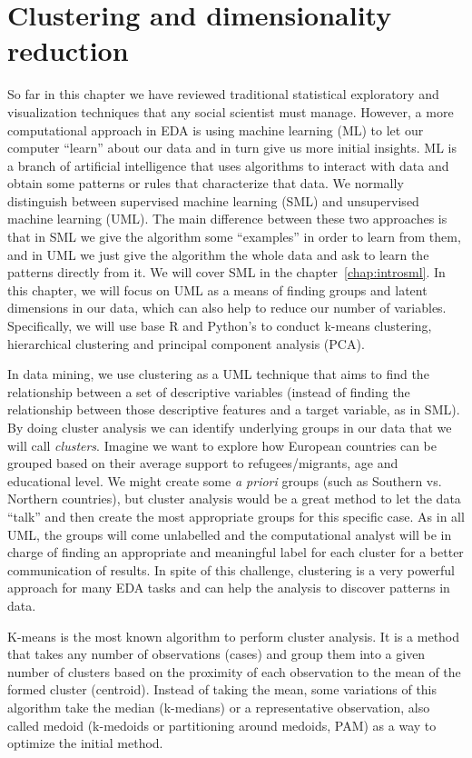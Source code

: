 \section{Clustering and dimensionality reduction}
\label{sec:clustering}

So far in this chapter we have reviewed traditional statistical exploratory and visualization techniques that any social scientist must manage. However, a more computational approach in EDA is using machine learning (ML) to let our computer “learn” about our data and in turn give us more initial insights.  ML is a branch of artificial intelligence that uses algorithms to interact with data and obtain some patterns or rules that characterize that data. We normally distinguish between supervised machine learning (SML) and unsupervised machine learning (UML). The main difference between these two approaches is that in SML we give the algorithm some “examples” in order to learn from them, and in UML we just give the algorithm the whole data and ask to learn the patterns directly from it. We will cover SML in the  chapter~\ref{chap:introsml}. In this chapter, we will focus on UML as a means of finding groups and latent dimensions in our data, which can also help to reduce our number of variables. Specifically, we will use base R and Python’s  to conduct k-means clustering, hierarchical clustering and principal component analysis (PCA). 

In data mining, we use clustering as a UML technique that aims to find the relationship between a set of descriptive variables (instead of finding the relationship between those descriptive features and a target variable, as in SML). By doing cluster analysis we can identify underlying groups in our data that we will call \textit{clusters}. Imagine we want to explore how European countries can be grouped based on their average support to refugees/migrants, age and educational level. We might create some \textit{a priori} groups (such as Southern vs. Northern countries), but cluster analysis would be a great method to let the data “talk” and then create the most appropriate groups for this specific case. As in all UML, the groups will come unlabelled and the computational analyst will be in charge of finding an appropriate and meaningful label for each cluster for a better communication of results. In spite of this challenge, clustering is a very powerful approach for many EDA tasks and can help the analysis to discover patterns in data.

K-means is the most known algorithm to perform cluster analysis. It is a method that takes any number of observations (cases) and group them into a given number of clusters based on the proximity of each observation to the mean of the formed cluster (centroid).  Instead of taking the mean, some variations of this algorithm take the median (k-medians) or a representative observation, also called medoid (k-medoids or partitioning around medoids, PAM) as a way to optimize the initial method.

